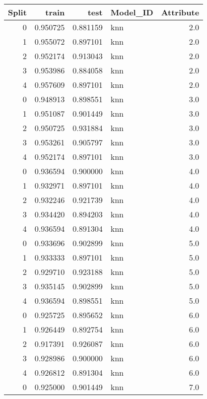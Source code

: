 \begin{tabular}{rrrlr}
\toprule
 Split &    train &     test & Model\_ID &  Attribute \\
\midrule
     0 & 0.950725 & 0.881159 &      knn &        2.0 \\
     1 & 0.955072 & 0.897101 &      knn &        2.0 \\
     2 & 0.952174 & 0.913043 &      knn &        2.0 \\
     3 & 0.953986 & 0.884058 &      knn &        2.0 \\
     4 & 0.957609 & 0.897101 &      knn &        2.0 \\
     0 & 0.948913 & 0.898551 &      knn &        3.0 \\
     1 & 0.951087 & 0.901449 &      knn &        3.0 \\
     2 & 0.950725 & 0.931884 &      knn &        3.0 \\
     3 & 0.953261 & 0.905797 &      knn &        3.0 \\
     4 & 0.952174 & 0.897101 &      knn &        3.0 \\
     0 & 0.936594 & 0.900000 &      knn &        4.0 \\
     1 & 0.932971 & 0.897101 &      knn &        4.0 \\
     2 & 0.932246 & 0.921739 &      knn &        4.0 \\
     3 & 0.934420 & 0.894203 &      knn &        4.0 \\
     4 & 0.936594 & 0.891304 &      knn &        4.0 \\
     0 & 0.933696 & 0.902899 &      knn &        5.0 \\
     1 & 0.933333 & 0.897101 &      knn &        5.0 \\
     2 & 0.929710 & 0.923188 &      knn &        5.0 \\
     3 & 0.935145 & 0.902899 &      knn &        5.0 \\
     4 & 0.936594 & 0.898551 &      knn &        5.0 \\
     0 & 0.925725 & 0.895652 &      knn &        6.0 \\
     1 & 0.926449 & 0.892754 &      knn &        6.0 \\
     2 & 0.917391 & 0.926087 &      knn &        6.0 \\
     3 & 0.928986 & 0.900000 &      knn &        6.0 \\
     4 & 0.926812 & 0.891304 &      knn &        6.0 \\
     0 & 0.925000 & 0.901449 &      knn &        7.0 \\

\end{tabular}
